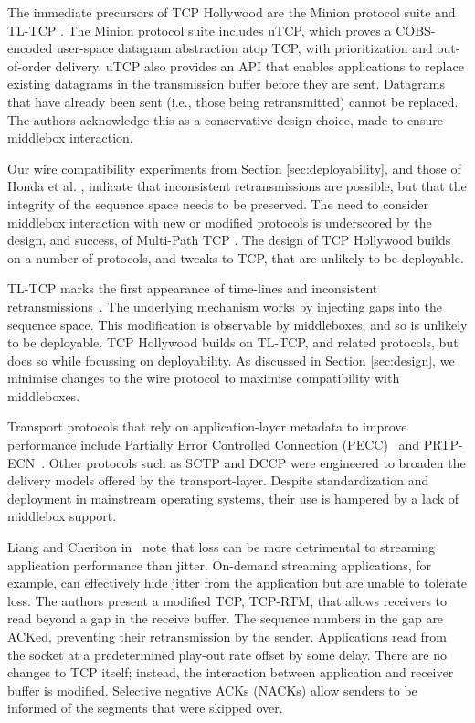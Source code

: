 
The immediate precursors of TCP Hollywood are the Minion protocol suite
\cite{nowlan:2012:minion} and TL-TCP \cite{mukherjee:2000:timelines}. The
Minion protocol suite includes uTCP, which proves a COBS-encoded user-space
datagram abstraction atop TCP, with prioritization and out-of-order
delivery. uTCP also provides an API that enables applications to replace
existing datagrams in the transmission buffer before they are sent.
Datagrams that have already been sent (i.e., those being retransmitted)
cannot be replaced. The authors acknowledge this as a conservative design
choice, made to ensure middlebox interaction.

Our wire compatibility experiments from Section \ref{sec:deployability},
and those of Honda et al. \cite{honda:2011:extend-tcp}, indicate that
inconsistent retransmissions are possible, but that the integrity of the
sequence space needs to be preserved. The need to consider middlebox
interaction with new or modified protocols is underscored by the design,
and success, of Multi-Path TCP \cite{raiciu:2012:hard}. The design of
TCP Hollywood builds on a number of protocols, and tweaks to TCP, that are
unlikely to be deployable.

TL-TCP marks the first appearance of time-lines and
inconsistent retransmissions~\cite{mukherjee:2000:timelines}. The underlying
mechanism works by injecting gaps into the sequence space. This modification is
observable by middleboxes, and so is unlikely to be deployable. TCP Hollywood
builds on TL-TCP, and related protocols, but does so while focussing on
deployability. As discussed in Section \ref{sec:design}, we minimise changes
to the wire protocol to maximise
compatibility with middleboxes.

Transport protocols that rely on application-layer metadata to
improve performance include Partially Error Controlled Connection
(PECC)~\cite{dempsey:1992:adaptive} and PRTP-ECN~\cite{grinnemo:2001:prtp}.
Other protocols such as SCTP \cite{rfc:4960} and DCCP \cite{rfc:4340} were
engineered to broaden the delivery models offered by the transport-layer.
Despite standardization and deployment in mainstream operating systems, their
use is hampered by a lack of middlebox support.

Liang and Cheriton in~\cite{liang:2002:tcp-rtm} note that loss can be more detrimental
to streaming application performance than jitter. On-demand streaming
applications, for example, can effectively hide jitter from the application but
are unable to tolerate loss. The authors present a modified TCP, TCP-RTM, that
allows receivers to read beyond a gap in the receive buffer. The sequence
numbers in the gap are ACKed, preventing their retransmission by the sender.
Applications read from the socket at a predetermined play-out rate offset by
some delay. There are no changes to TCP itself; instead, the interaction
between application and receiver buffer is modified. Selective negative
ACKs (NACKs) allow senders to be informed of the segments that were skipped
over.

